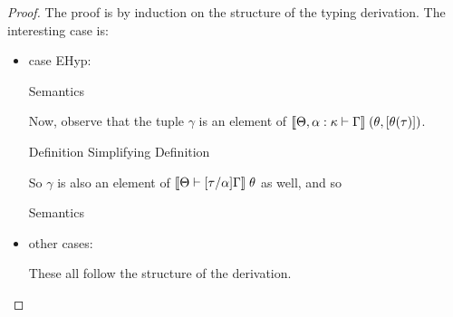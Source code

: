 \begin{proof}
  The proof is by induction on the structure of the typing derivation. The
interesting case is: 

\begin{itemize}
\item case EHyp: 

  \begin{eqnproof}
        [\interpE{\judgeE[\Theta, \alpha:\kappa]
                         {\Gamma}
                         {x_i}{A_i}}\;(\theta, {[\theta(\tau)]})\;\gamma =]
          {Semantics}
  \end{eqnproof}

  Now, observe that the tuple $\gamma$ is an element of $[\![{\Theta,\alpha:\kappa \vdash \Gamma}]\!]\;(\theta, [\theta(\tau)])$.

  \begin{eqnproof}[\interp{\Theta,\alpha:\kappa \vdash \Gamma}\;(\theta, {[\theta(\tau)]}) =]
           {Definition}
           {Simplifying}
     \eline{\interp{\Theta \vdash [\tau/\alpha]\Gamma}\;\theta}
           {Definition}
  \end{eqnproof}

So $\gamma$ is also an element of $[\![{\Theta \vdash [\tau/\alpha]\Gamma}]\!]\;\theta$ as well, and so 

  \begin{eqnproof}[\interpE{\judgeE{[\tau/\alpha]\Gamma}{x_i}{[\tau/\alpha]A_i}}\;\theta\;\gamma=]
          {Semantics}
          {}
  \end{eqnproof}

\item other cases: 

These all follow the structure of the derivation. 
\end{itemize}
\end{proof}

